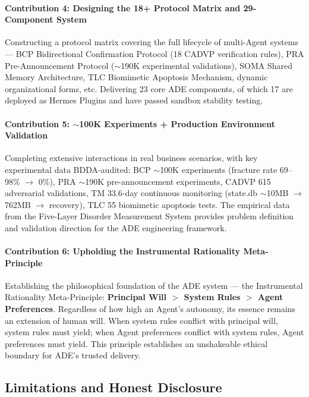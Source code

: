 \documentclass[11pt,a4paper]{article}
\begin{document}
\paragraph{Contribution 4: Designing the 18+ Protocol Matrix and 29-Component System}
Constructing a protocol matrix covering the full lifecycle of multi-Agent systems --- BCP Bidirectional Confirmation Protocol (18 CADVP verification rules), PRA Pre-Announcement Protocol ($\sim$190K experimental validations), SOMA Shared Memory Architecture, TLC Biomimetic Apoptosis Mechanism, dynamic organizational forms, etc. Delivering 23 core ADE components, of which 17 are deployed as Hermes Plugins and have passed sandbox stability testing.

\paragraph{Contribution 5: $\sim$100K Experiments + Production Environment Validation}
Completing extensive interactions in real business scenarios, with key experimental data BDDA-audited: BCP $\sim$100K experiments (fracture rate 69--98\% $\rightarrow$ 0\%), PRA $\sim$190K pre-announcement experiments, CADVP 615 adversarial validations, TM 33.6-day continuous monitoring (state.db $\sim$10MB $\rightarrow$ 762MB $\rightarrow$ recovery), TLC 55 biomimetic apoptosis tests. The empirical data from the Five-Layer Disorder Measurement System provides problem definition and validation direction for the ADE engineering framework.

\paragraph{Contribution 6: Upholding the Instrumental Rationality Meta-Principle}
Establishing the philosophical foundation of the ADE system --- the Instrumental Rationality Meta-Principle: \textbf{Principal Will $>$ System Rules $>$ Agent Preferences}. Regardless of how high an Agent's autonomy, its essence remains an extension of human will. When system rules conflict with principal will, system rules must yield; when Agent preferences conflict with system rules, Agent preferences must yield. This principle establishes an unshakeable ethical boundary for ADE's trusted delivery.

\subsection{Limitations and Honest Disclosure}
\label{sec:12.2}
\end{document}
